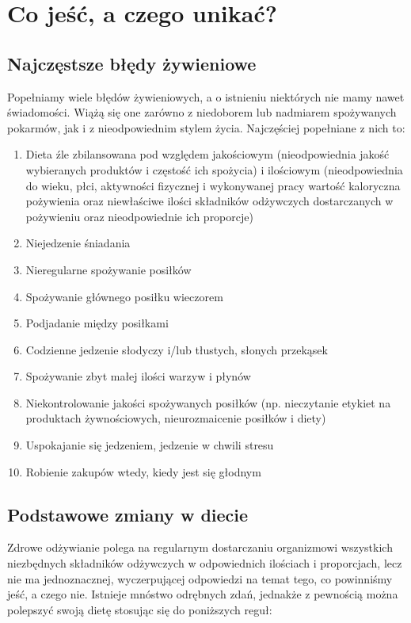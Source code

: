 \documentclass{article}
\begin{document}
\section{Co jeść, a czego unikać?}
\subsection{Najczęstsze błędy żywieniowe}
Popełniamy wiele błędów żywieniowych, a o istnieniu niektórych nie mamy nawet świadomości. Wiążą się one zarówno z niedoborem lub nadmiarem spożywanych pokarmów, jak i z nieodpowiednim stylem życia. Najczęściej popełniane z nich to:
\begin{enumerate}
\item Dieta źle zbilansowana pod względem jakościowym (nieodpowiednia jakość wybieranych produktów i częstość ich spożycia) i ilościowym (nieodpowiednia do wieku, płci, aktywności fizycznej i wykonywanej pracy wartość kaloryczna pożywienia oraz niewłaściwe ilości składników odżywczych dostarczanych w pożywieniu oraz nieodpowiednie ich proporcje)
\item Niejedzenie śniadania
\item Nieregularne spożywanie posiłków
\item Spożywanie głównego posiłku wieczorem
\item Podjadanie między posiłkami
\item Codzienne jedzenie słodyczy i/lub tłustych, słonych przekąsek
\item Spożywanie zbyt małej ilości warzyw i płynów
\item Niekontrolowanie jakości spożywanych posiłków (np. nieczytanie etykiet na produktach żywnościowych, nieurozmaicenie posiłków i diety)
\item Uspokajanie się jedzeniem, jedzenie w chwili stresu
\item Robienie zakupów wtedy, kiedy jest się głodnym
\end{enumerate}

\subsection{Podstawowe zmiany w diecie}
Zdrowe odżywianie polega na regularnym dostarczaniu organizmowi wszystkich niezbędnych składników odżywczych w odpowiednich ilościach i proporcjach, lecz nie ma jednoznacznej, wyczerpującej odpowiedzi na temat tego, co powinniśmy jeść, a czego nie. Istnieje mnóstwo odrębnych zdań, jednakże z pewnością można polepszyć swoją dietę stosując się do poniższych reguł:
\end{document}

